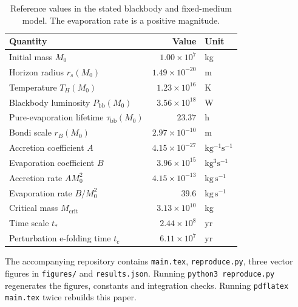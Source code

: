 \documentclass[11pt,a4paper]{article}
\newcommand{\Mcrit}{M_{\mathrm{crit}}}
\newcommand{\tstar}{t_*}
\newcommand{\taubb}{\tau_{\mathrm{bb}}}
\newcommand{\Pbb}{P_{\mathrm{bb}}}
\begin{document}
\begin{table}[htbp]
\centering\small
\caption{Reference values in the stated blackbody and fixed-medium model. The evaporation rate is a positive magnitude.}\label{tab:values}
\begin{tabular}{@{}p{.58\linewidth}r l@{}}
\toprule
Quantity & Value & Unit\\
\midrule
Initial mass $M_0$ & $1.00\times10^7$ & kg\\
Horizon radius $r_s(M_0)$ & $1.49\times10^{-20}$ & m\\
Temperature $T_H(M_0)$ & $1.23\times10^{16}$ & K\\
Blackbody luminosity $\Pbb(M_0)$ & $3.56\times10^{18}$ & W\\
Pure-evaporation lifetime $\taubb(M_0)$ & $23.37$ & h\\
Bondi scale $r_B(M_0)$ & $2.97\times10^{-10}$ & m\\
Accretion coefficient $A$ & $4.15\times10^{-27}$ & $\mathrm{kg^{-1}s^{-1}}$\\
Evaporation coefficient $B$ & $3.96\times10^{15}$ & $\mathrm{kg^3s^{-1}}$\\
Accretion rate $AM_0^2$ & $4.15\times10^{-13}$ & $\mathrm{kg\,s^{-1}}$\\
Evaporation rate $B/M_0^2$ & $39.6$ & $\mathrm{kg\,s^{-1}}$\\
Critical mass $\Mcrit$ & $3.13\times10^{10}$ & kg\\
Time scale $\tstar$ & $2.44\times10^8$ & yr\\
Perturbation e-folding time $t_e$ & $6.11\times10^7$ & yr\\
\bottomrule
\end{tabular}
\end{table}

The accompanying repository contains \texttt{main.tex}, \texttt{reproduce.py}, three vector figures in \texttt{figures/} and \texttt{results.json}. Running \texttt{python3 reproduce.py} regenerates the figures, constants and integration checks. Running \texttt{pdflatex main.tex} twice rebuilds this paper.
\end{document}
